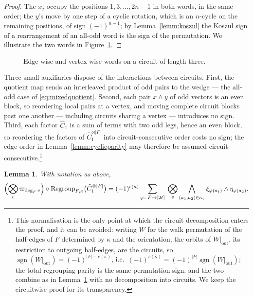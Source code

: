 \documentclass[11pt]{article}
\newtheorem{lemm}[theo]{Lemma}
\newcommand{\twistedC}{\widehat{C}}               %
\newcommand{\symq}[1]{\varpi_{#1}}                %
\begin{document}
\begin{proof}
The $x_{j}$ occupy the positions $1,3,\dotsc,2n-1$ in both
words, in the same
order; the $y$'s move by one step of a cyclic rotation, which is
an $n$-cycle on the remaining positions, of sign $(-1)^{n-1}$; by
Lemma~\ref{lemm:koszul} the Koszul sign of a rearrangement of an
all-odd word is the sign of the permutation. We illustrate the
two words in Figure~\ref{fig:circuit}.
\end{proof}

\begin{figure}
\centering

\caption{Edge-wise and vertex-wise words on a circuit of length
three.}
\label{fig:circuit}
\end{figure}
\FloatBarrier

Three small auxiliaries dispose of the interactions between
circuits. First, the quotient map sends an interleaved product of
odd pairs to the wedge --- the all-odd case of
\eqref{eq:mixedquotient}. Second, each pair
$x\wedge y$ of odd vectors is an even block, so reordering local
pairs at a vertex, and moving complete circuit blocks past one
another --- including circuits sharing a vertex --- introduces no
sign. Third, each factor $\twistedC_{1}$ is a sum of terms with
two odd legs, hence an even block, so reordering the factors of
$\twistedC_{1}^{\otimes|F|}$ into circuit-consecutive order costs
no sign; the edge order in Lemma~\ref{lemm:cyclicparity} may
therefore be assumed circuit-consecutive.\footnote{This
normalisation is the only point at which the circuit
decomposition enters the proof, and it can be avoided: writing
$W$ for the walk permutation of the half-edges of $F$ determined
by $\kappa$ and the orientation, the orbits of
$W|_{\mathrm{out}}$, its restriction to outgoing half-edges, are
the circuits, so
$\operatorname{sgn}(W|_{\mathrm{out}})=(-1)^{|F|-c(\kappa)}$,
i.e.\ $(-1)^{c(\kappa)}=(-1)^{|F|}
\operatorname{sgn}(W|_{\mathrm{out}})$; the total regrouping
parity is the same permutation sign, and the two combine as in
Lemma~\ref{lemm:circuitsign} with no decomposition into circuits.
We keep the circuitwise proof for its transparency.}

\begin{lemm}\label{lemm:circuitsign}
With notation as above,
\[
\Bigl(\bigotimes_{v}\symq{\deg_{F}v}\Bigr)\circ
\mathrm{Regroup}_{F,\kappa}
\bigl(\twistedC_{1}^{\otimes|F|}\bigr)
=(-1)^{c(\kappa)}
\sum_{\varphi\colon F\to[2\ell]}\;
\bigotimes_{v}\bigwedge_{(a_{1},a_{2})\in\kappa_{v}}
\xi_{\varphi(a_{1})}\wedge\eta_{\varphi(a_{2})} .
\]
\end{lemm}
\end{document}

